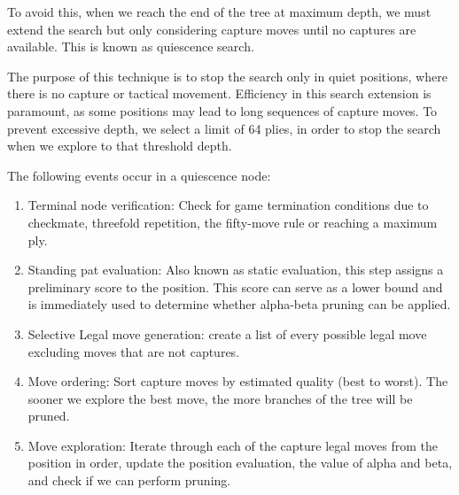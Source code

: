 \vspace{1em}

To avoid this, when we reach the end of the tree at maximum depth, we must extend the search but only considering capture moves until no captures are available. This is known as quiescence search. ~\cite{QuiescenceSearch}

\vspace{1em}

\noindent The purpose of this technique is to stop the search only in quiet positions, where there is no capture or tactical movement. Efficiency in this search extension is paramount, as some positions may lead to long sequences of capture moves. To prevent excessive depth, we select a limit of 64 plies, in order to stop the search when we explore to that threshold depth.

\vspace{2em}

The following events occur in a quiescence node:

\vspace{1em}

\begin{enumerate}

    \item Terminal node verification: Check for game termination conditions due to checkmate, threefold repetition, the fifty-move rule or reaching a maximum ply.
    
    \item Standing pat evaluation: Also known as static evaluation, this step assigns a preliminary score to the position. This score can serve as a lower bound and is immediately used to determine whether alpha-beta pruning can be applied.
     
    \item Selective Legal move generation: create a list of every possible legal move excluding moves that are not captures.
    
    \item Move ordering: Sort capture moves by estimated quality (best to worst). The sooner we explore the best move, the more branches of the tree will be pruned.
    
    \item Move exploration: Iterate through each of the capture legal moves from the position in order, update the position evaluation, the value of alpha and beta, and check if we can perform pruning.
    
\end{enumerate}

